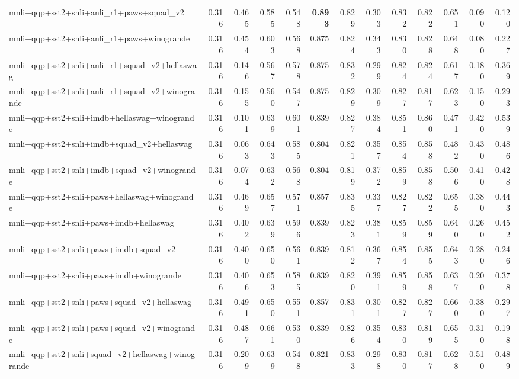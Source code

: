 \begin{table}[t]
\begin{tabular}{lrrrrrrrrrrrr}
    mnli+qqp+sst2+snli+anli\_r1+paws+squad\_v2 & 0.316 & 0.465 & 0.585 & 0.548 & \textbf{0.893} & 0.829 & 0.303 & 0.832 & 0.822 & 0.651 & 0.090 & 0.120 \\
    mnli+qqp+sst2+snli+anli\_r1+paws+winogrande & 0.316 & 0.454 & 0.603 & 0.568 & 0.875 & 0.824 & 0.343 & 0.830 & 0.828 & 0.648 & 0.080 & 0.227 \\
    mnli+qqp+sst2+snli+anli\_r1+squad\_v2+hellaswag & 0.316 & 0.146 & 0.567 & 0.578 & 0.875 & 0.832 & 0.299 & 0.824 & 0.824 & 0.617 & 0.180 & 0.369 \\
    mnli+qqp+sst2+snli+anli\_r1+squad\_v2+winogrande & 0.316 & 0.155 & 0.560 & 0.547 & 0.875 & 0.829 & 0.309 & 0.827 & 0.817 & 0.623 & 0.150 & 0.293 \\
    mnli+qqp+sst2+snli+imdb+hellaswag+winogrande & 0.316 & 0.101 & 0.639 & 0.601 & 0.839 & 0.827 & 0.384 & 0.851 & 0.860 & 0.471 & 0.420 & 0.539 \\
    mnli+qqp+sst2+snli+imdb+squad\_v2+hellaswag & 0.316 & 0.063 & 0.643 & 0.585 & 0.804 & 0.821 & 0.357 & 0.854 & 0.858 & 0.482 & 0.430 & 0.486 \\
    mnli+qqp+sst2+snli+imdb+squad\_v2+winogrande & 0.316 & 0.074 & 0.632 & 0.568 & 0.804 & 0.819 & 0.372 & 0.859 & 0.858 & 0.506 & 0.410 & 0.428 \\
    mnli+qqp+sst2+snli+paws+hellaswag+winogrande & 0.316 & 0.469 & 0.657 & 0.571 & 0.857 & 0.835 & 0.337 & 0.827 & 0.822 & 0.655 & 0.380 & 0.443 \\
    mnli+qqp+sst2+snli+paws+imdb+hellaswag & 0.316 & 0.402 & 0.639 & 0.596 & 0.839 & 0.823 & 0.381 & 0.859 & 0.859 & 0.640 & 0.260 & 0.452 \\
    mnli+qqp+sst2+snli+paws+imdb+squad\_v2 & 0.316 & 0.400 & 0.650 & 0.561 & 0.839 & 0.812 & 0.367 & 0.854 & 0.855 & 0.643 & 0.280 & 0.246 \\
    mnli+qqp+sst2+snli+paws+imdb+winogrande & 0.316 & 0.406 & 0.653 & 0.585 & 0.839 & 0.820 & 0.391 & 0.859 & 0.858 & 0.637 & 0.200 & 0.378 \\
    mnli+qqp+sst2+snli+paws+squad\_v2+hellaswag & 0.316 & 0.491 & 0.650 & 0.551 & 0.857 & 0.831 & 0.301 & 0.827 & 0.827 & 0.660 & 0.380 & 0.297 \\
    mnli+qqp+sst2+snli+paws+squad\_v2+winogrande & 0.316 & 0.487 & 0.661 & 0.530 & 0.839 & 0.826 & 0.354 & 0.830 & 0.819 & 0.655 & 0.310 & 0.198 \\
    mnli+qqp+sst2+snli+squad\_v2+hellaswag+winogrande & 0.316 & 0.209 & 0.639 & 0.548 & 0.821 & 0.833 & 0.298 & 0.830 & 0.817 & 0.628 & 0.510 & 0.489 \\

\end{tabular}
\end{table}
